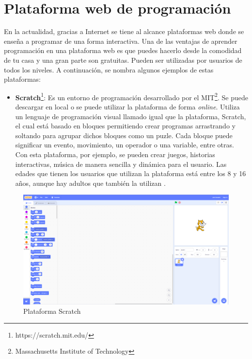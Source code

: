 \section{Plataforma web de programación}
En la actualidad, gracias a Internet se tiene al alcance plataformas web donde se enseña a programar de una forma interactiva. Una de las ventajas de aprender programación en una plataforma web es que puedes hacerlo desde la comodidad de tu casa y una gran parte son gratuitas. Pueden ser utilizadas por usuarios de todos los niveles. A continuación, se nombra algunos ejemplos de estas plataformas:\\
\newpage
\begin{itemize}
\item \textbf{Scratch}\footnote{https://scratch.mit.edu/}: Es un entorno de programación desarrollado por el MIT\footnote{Massachusetts Institute of Technology}. Se puede descargar en local o se puede utilizar la plataforma de forma \textit{online}. Utiliza un lenguaje de programación visual llamado igual que la plataforma, Scratch, el cual está basado en bloques permitiendo crear programas arrastrando y soltando para agrupar dichos bloques como un puzle. Cada bloque puede significar un evento, movimiento, un operador o una variable, entre otras. Con esta plataforma, por ejemplo, se pueden crear juegos, historias interactivas, música de manera sencilla y dinámica para el usuario. Las edades que tienen los usuarios que utilizan la plataforma está entre los 8 y 16 años, aunque hay adultos que también la utilizan \cite{scratch}.
\end{itemize}

\begin{figure}[H]
    \centering
    \includegraphics[width=12cm, keepaspectratio]{img/scratch.png}
    \caption{Plataforma Scratch}
    \label{fig:scrach}
\end{figure}

